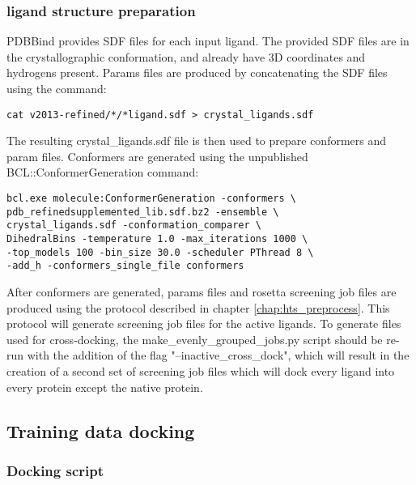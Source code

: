 \subsubsection{ligand structure preparation}

PDBBind provides \ac{SDF} files for each input ligand.
The provided \ac{SDF} files are in the crystallographic conformation, and already have 3D coordinates and hydrogens present. 
Params files are produced by concatenating the \ac{SDF} files using the command:
\singlespace
\begin{Verbatim}
cat v2013-refined/*/*ligand.sdf > crystal_ligands.sdf
\end{Verbatim}
\doublespace
The resulting crystal\_ligands.sdf file is then used to prepare conformers and param files.
Conformers are generated using the unpublished BCL::ConformerGeneration command:
\singlespace
\begin{verbatim}
bcl.exe molecule:ConformerGeneration -conformers \
pdb_refinedsupplemented_lib.sdf.bz2 -ensemble \
crystal_ligands.sdf -conformation_comparer \
DihedralBins -temperature 1.0 -max_iterations 1000 \
-top_models 100 -bin_size 30.0 -scheduler PThread 8 \
-add_h -conformers_single_file conformers
\end{verbatim}
\doublespace
After conformers are generated, params files and rosetta screening job files are produced using the protocol described in chapter \ref{chap:hts_preprocess}.
This protocol will generate screening job files for the active ligands.
To generate files used for cross-docking, the make\_evenly\_grouped\_jobs.py script should be re-run with the addition of the flag "--inactive\_cross\_dock", which will result in the creation of a second set of screening job files which will dock every ligand into every protein except the native protein.

\subsection{Training data docking}

\subsubsection{Docking script}

